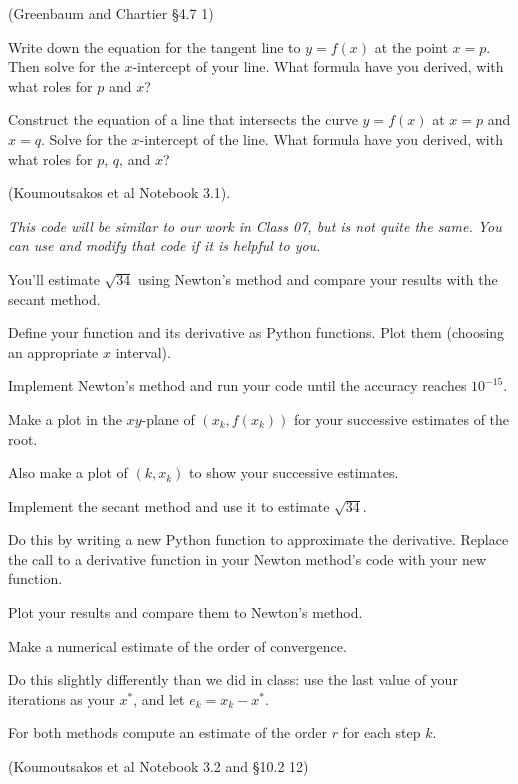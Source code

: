 \documentclass[12pt,letterpaper,noanswers]{exam}
\begin{document}
\begin{questions}
\item (Greenbaum and Chartier \S 4.7 1)
\begin{parts}
\item Write down the equation for the tangent line to $y = f(x)$ at the point $x = p$.  Then solve for the $x$-intercept of your line.  What formula have you derived, with what roles for $p$ and $x$?
\item Construct the equation of a line that intersects the curve $y = f(x)$ at $x = p$ and $x = q$.  Solve for the $x$-intercept of the line.  What formula have you derived, with what roles for $p$, $q$, and $x$?
\end{parts}

\item (Koumoutsakos et al Notebook 3.1). 

\emph{This code will be similar to our work in Class 07, but is not quite the same.  You can use and modify that code if it is helpful to you.}

You'll estimate $\sqrt{34}$ using Newton's method and compare your results with the secant method.
\begin{parts}
\item Define your function and its derivative as Python functions.  Plot them (choosing an appropriate $x$ interval).
\item Implement Newton's method and run your code until the accuracy reaches $10^{-15}$.  

Make a plot in the $xy$-plane of $(x_k,f(x_k))$ for your successive estimates of the root.

Also make a plot of $(k,x_k)$ to show your successive estimates.
\item Implement the secant method and use it to estimate $\sqrt{34}$.

Do this by writing a new Python function to approximate the derivative.  Replace the call to a derivative function in your Newton method's code with your new function.

Plot your results and compare them to Newton's method.

\item Make a numerical estimate of the order of convergence.

Do this slightly differently than we did in class: use the last value of your iterations as  your $x^*$, and let $e_k = x_k-x^*$.

For both methods compute an estimate of the order $r$ for each step $k$. 
\end{parts}
\item (Koumoutsakos et al Notebook 3.2 and \citep{burden2010numerical} \S10.2 12)



\end{questions}
\end{document}
